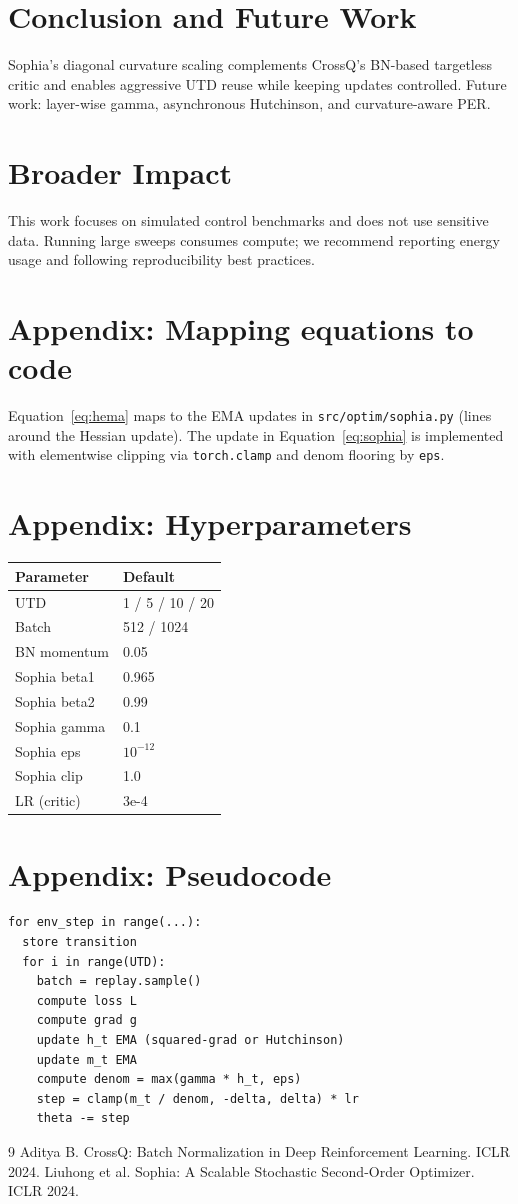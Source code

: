 \documentclass{article}
\begin{document}
\section{Conclusion and Future Work}
Sophia's diagonal curvature scaling complements CrossQ's BN-based targetless critic and enables aggressive UTD reuse while keeping updates controlled. Future work: layer-wise gamma, asynchronous Hutchinson, and curvature-aware PER.

\section*{Broader Impact}
This work focuses on simulated control benchmarks and does not use sensitive data. Running large sweeps consumes compute; we recommend reporting energy usage and following reproducibility best practices.

\appendix
\section{Appendix: Mapping equations to code}
Equation~\eqref{eq:hema} maps to the EMA updates in \texttt{src/optim/sophia.py} (lines around the Hessian update). The update in Equation~\eqref{eq:sophia} is implemented with elementwise clipping via \texttt{torch.clamp} and denom flooring by \texttt{eps}.

\section{Appendix: Hyperparameters}
\begin{tabular}{l l}
\toprule
Parameter & Default \\
\midrule
UTD & 1 / 5 / 10 / 20 \\
Batch & 512 / 1024 \\
BN momentum & 0.05 \\
Sophia beta1 & 0.965 \\
Sophia beta2 & 0.99 \\
Sophia gamma & 0.1 \\
Sophia eps & $10^{-12}$ \\
Sophia clip & 1.0 \\
LR (critic) & 3e-4 \\
\bottomrule
\end{tabular}

\section{Appendix: Pseudocode}
\begin{verbatim}
for env_step in range(...):
  store transition
  for i in range(UTD):
    batch = replay.sample()
    compute loss L
    compute grad g
    update h_t EMA (squared-grad or Hutchinson)
    update m_t EMA
    compute denom = max(gamma * h_t, eps)
    step = clamp(m_t / denom, -delta, delta) * lr
    theta -= step
\end{verbatim}


\begin{thebibliography}{9}
 Aditya B. CrossQ: Batch Normalization in Deep Reinforcement Learning. ICLR 2024.
 Liuhong et al. Sophia: A Scalable Stochastic Second-Order Optimizer. ICLR 2024.
\end{thebibliography}
\end{document}
